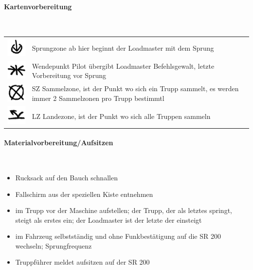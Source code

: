 \paragraph{Kartenvorbereitung} \ \\
\begin{tabular}{p{3cm} p{15cm}}
	\includegraphics[scale=1]{./img/fortgeschrittenes/fallschirmspringen/Endpunkt.png}		&		Sprungzone ab hier beginnt der Loadmaster mit dem Sprung\\
	\includegraphics[scale=1]{./img/fortgeschrittenes/fallschirmspringen/Treffpunkt.png} 		&		Wendepunkt Pilot übergibt Loadmaster Befehlsgewalt, letzte Vorbereitung vor Sprung\\
	\includegraphics[scale=1]{./img/fortgeschrittenes/fallschirmspringen/Aufgabe.png}		&		SZ Sammelzone, ist der Punkt wo sich ein Trupp sammelt, es werden immer 2 Sammelzonen pro Trupp bestimmtl \\
	\includegraphics[scale=1]{./img/fortgeschrittenes/fallschirmspringen/LZ.png}			&		LZ Landezone, ist der Punkt wo sich alle Truppen sammeln \\
\end{tabular}

\paragraph{Materialvorbereitung/Aufsitzen}  \ \\

	\begin{itemize}
		\item Rucksack auf den Bauch schnallen 
		\item  Fallschirm aus der speziellen Kiste entnehmen
		\item  im Trupp vor der Maschine aufstellen; der Trupp, der als letztes springt, steigt als erstes ein; der Loadmaster ist der letzte der einsteigt
		\item im Fahrzeug selbstständig und ohne Funkbestätigung auf die SR 200 wechseln; Sprungfrequenz
		\item  Truppführer meldet aufsitzen auf der SR 200
	\end{itemize}

